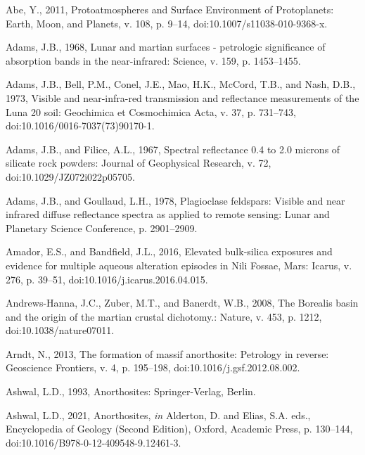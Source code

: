 \documentclass[11pt]{article}
\begin{document}
\begin{thebibliography}{99}
%  
%  

 Abe, Y., 2011, Protoatmospheres and Surface Environment of Protoplanets: Earth, Moon, and Planets, v. 108, p. 9--14, doi:10.1007/s11038-010-9368-x.

 Adams, J.B., 1968, Lunar and martian surfaces - petrologic significance of absorption bands in the near-infrared: Science, v. 159, p. 1453--1455.

 Adams, J.B., Bell, P.M., Conel, J.E., Mao, H.K., McCord, T.B., and Nash, D.B., 1973, Visible and near-infra-red transmission and reflectance measurements of the Luna 20 soil: Geochimica et Cosmochimica Acta, v. 37, p. 731--743, doi:10.1016/0016-7037(73)90170-1.

 Adams, J.B., and Filice, A.L., 1967, Spectral reflectance 0.4 to 2.0 microns of silicate rock powders: Journal of Geophysical Research, v. 72, doi:10.1029/JZ072i022p05705.

 Adams, J.B., and Goullaud, L.H., 1978, Plagioclase feldspars: Visible and near infrared diffuse reflectance spectra as applied to remote sensing: Lunar and Planetary Science Conference, p. 2901--2909.

 Amador, E.S., and Bandfield, J.L., 2016, Elevated bulk-silica exposures and evidence for multiple aqueous alteration episodes in Nili Fossae, Mars: Icarus, v. 276, p. 39--51, doi:10.1016/j.icarus.2016.04.015.

 Andrews-Hanna, J.C., Zuber, M.T., and Banerdt, W.B., 2008, The Borealis basin and the origin of the martian crustal dichotomy.: Nature, v. 453, p. 1212, doi:10.1038/nature07011.

 Arndt, N., 2013, The formation of massif anorthosite: Petrology in reverse: Geoscience Frontiers, v. 4, p. 195--198, doi:10.1016/j.gsf.2012.08.002.

 Ashwal, L.D., 1993, Anorthosites: Springer-Verlag, Berlin.

 Ashwal, L.D., 2021, Anorthosites, \textit{in} Alderton, D. and Elias, S.A. eds., Encyclopedia of Geology (Second Edition), Oxford, Academic Press, p. 130--144, doi:10.1016/B978-0-12-409548-9.12461-3.


\end{thebibliography}
\end{document}
